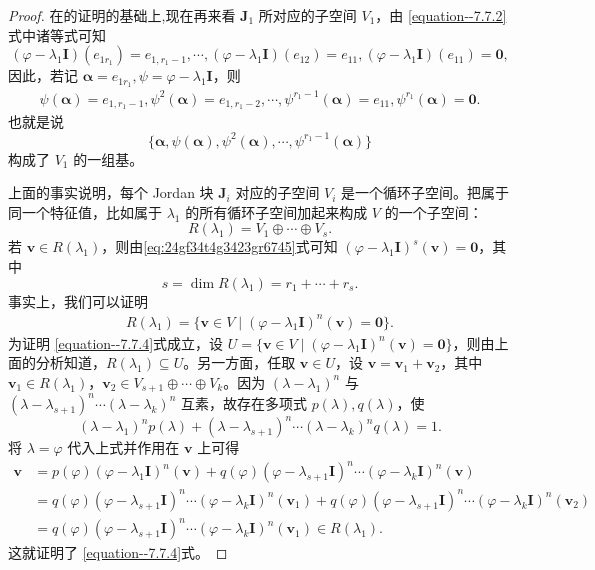 \documentclass[../../main.tex]{subfiles}%
\begin{document}
\begin{proof}
在的证明的基础上,现在再来看 $\boldsymbol{J}_1$ 所对应的子空间 $V_1$，由 \eqref{equation--7.7.2}式中诸等式可知
\[
(\varphi - \lambda_1\boldsymbol{I})(e_{1r_1}) = e_{1,r_1 - 1}, \cdots, (\varphi - \lambda_1\boldsymbol{I})(e_{12}) = e_{11}, (\varphi - \lambda_1\boldsymbol{I})(e_{11}) = \boldsymbol{0},
\]
因此，若记 $\boldsymbol{\alpha} = e_{1r_1}, \psi = \varphi - \lambda_1\boldsymbol{I}$，则
\begin{align}\label{eq:24gf34t4g3423gr6745}
\psi(\boldsymbol{\alpha}) = e_{1,r_1 - 1},  \psi^2(\boldsymbol{\alpha}) = e_{1,r_1 - 2},  \cdots,  \psi^{r_1 - 1}(\boldsymbol{\alpha}) = e_{11},  \psi^{r_1}(\boldsymbol{\alpha}) = \boldsymbol{0}.
\end{align}
也就是说
\[
\{\boldsymbol{\alpha}, \psi(\boldsymbol{\alpha}), \psi^2(\boldsymbol{\alpha}), \cdots, \psi^{r_1 - 1}(\boldsymbol{\alpha})\}
\]
构成了 $V_1$ 的一组基。

上面的事实说明，每个 Jordan 块 $\boldsymbol{J}_i$ 对应的子空间 $V_i$ 是一个循环子空间。把属于同一个特征值，比如属于 $\lambda_1$ 的所有循环子空间加起来构成 $V$ 的一个子空间：
\[
R(\lambda_1) = V_1 \oplus \cdots \oplus V_s.
\]
若 $\boldsymbol{v} \in R(\lambda_1)$，则由\eqref{eq:24gf34t4g3423gr6745}式可知 $(\varphi - \lambda_1\boldsymbol{I})^s(\boldsymbol{v}) = \boldsymbol{0}$，其中
\[
s = \dim R(\lambda_1) = r_1 + \cdots + r_s.
\]
事实上，我们可以证明
\begin{align}\label{equation--7.7.4}
R(\lambda_1) = \{\boldsymbol{v} \in V \mid (\varphi - \lambda_1\boldsymbol{I})^n(\boldsymbol{v}) = \boldsymbol{0}\}.
\end{align}
为证明 \eqref{equation--7.7.4}式成立，设 $U = \{\boldsymbol{v} \in V \mid (\varphi - \lambda_1\boldsymbol{I})^n(\boldsymbol{v}) = \boldsymbol{0}\}$，则由上面的分析知道，$R(\lambda_1) \subseteq U$。另一方面，任取 $\boldsymbol{v} \in U$，设 $\boldsymbol{v} = \boldsymbol{v}_1 + \boldsymbol{v}_2$，其中 $\boldsymbol{v}_1 \in R(\lambda_1)$，$\boldsymbol{v}_2 \in V_{s + 1} \oplus \cdots \oplus V_k$。因为 $(\lambda - \lambda_1)^n$ 与 $(\lambda - \lambda_{s + 1})^n \cdots (\lambda - \lambda_k)^n$ 互素，故存在多项式 $p(\lambda), q(\lambda)$，使
\[
(\lambda - \lambda_1)^n p(\lambda) + (\lambda - \lambda_{s + 1})^n \cdots (\lambda - \lambda_k)^n q(\lambda) = 1.
\]
将 $\lambda = \varphi$ 代入上式并作用在 $\boldsymbol{v}$ 上可得
\begin{align*}
\boldsymbol{v} &= p(\varphi)(\varphi - \lambda_1\boldsymbol{I})^n(\boldsymbol{v}) + q(\varphi)(\varphi - \lambda_{s + 1}\boldsymbol{I})^n \cdots (\varphi - \lambda_k\boldsymbol{I})^n(\boldsymbol{v}) \\
&= q(\varphi)(\varphi - \lambda_{s + 1}\boldsymbol{I})^n \cdots (\varphi - \lambda_k\boldsymbol{I})^n(\boldsymbol{v}_1) + q(\varphi)(\varphi - \lambda_{s + 1}\boldsymbol{I})^n \cdots (\varphi - \lambda_k\boldsymbol{I})^n(\boldsymbol{v}_2) \\
&= q(\varphi)(\varphi - \lambda_{s + 1}\boldsymbol{I})^n \cdots (\varphi - \lambda_k\boldsymbol{I})^n(\boldsymbol{v}_1) \in R(\lambda_1).
\end{align*}
这就证明了 \eqref{equation--7.7.4}式。


\end{proof}
\end{document}
